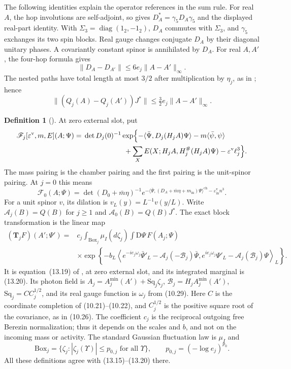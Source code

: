 \documentclass[11pt,letterpaper,reqno]{amsart}
\theoremstyle{definition}
\newtheorem{qcmdefinition}[qcmproposition]{Definition}
\newenvironment{definition}[1][]{\pushQED{\qed}\renewcommand{\qedsymbol}{$\blacksquare$}\begin{qcmdefinition}[#1]}{\popQED\end{qcmdefinition}}
\begin{document}
The following identities explain the operator references in the
sum rule. For real $A$, the hop involutions are self-adjoint,
so \cite[equations~(9.2)--(9.4)]{QEDConstruction} gives
$D_A^*=\gamma_5D_A\gamma_5$ and the displayed real-part identity.
With $\Sigma_3=\operatorname{diag}(1_2,-1_2)$, $D_A$ commutes
with $\Sigma_3$, and $\gamma_5$ exchanges its two spin blocks.
Real gauge changes conjugate $D_A$ by their diagonal unitary
phases. A covariantly constant spinor is annihilated by $D_A$.
For real $A,A'$, the four-hop formula gives
\[
 \|D_A-D_{A'}\|\le6e_j\|A-A'\|_\infty.
\]
The nested paths have total length at most $3/2$ after
multiplication by $\eta_j$, as in
\cite[Section~9.5]{QEDConstruction}; hence
\[
 \|(Q_j(A)-Q_j(A'))J^*\|
              \le\tfrac32e_j\|A-A'\|_\infty.
\]

\begin{definition}\label{qcm:rg-density}
At zero external slot, put
\begin{align*}
 \mathscr F_j[\varepsilon^{\mathrm v},m,E](A;\Psi)
 ={}&\det D_j(0)^{-1}\exp\Bigl\{
 -\langle\bar\Psi,D_j(H_jA)\Psi\rangle
 -m\langle\bar\psi,\psi\rangle\\
 &\hspace{20mm}+\sum_XE(X;H_jA,H_j^\#(H_jA)\Psi)
 -\varepsilon^{\mathrm v}\ell_j^3\Bigr\}.
\end{align*}
The mass pairing is the chamber pairing and the first pairing
is the unit-spinor pairing. At $j=0$ this means
\[
 \mathscr F_0(A;\Psi)=
 \det(D_0+\bar m\eta)^{-1}
 e^{-\langle\bar\Psi,(D_A+\bar m\eta+m_{\mathrm{in}})\Psi\rangle^{\mathrm{ch}}
        -\varepsilon_{\mathrm{in}}^{\mathrm v}n^3}.
\]
For a unit spinor $v$, its dilation is $v_L(y)=L^{-1}v(y/L)$.
Write $\mathcal A_j(B)=Q(B)$ for $j\ge1$ and
$\mathcal A_0(B)=Q(B)J^*$.
The exact block transformation is the linear map
\begin{align*}
 (\mathbf T_jF)(A';\Psi')
 ={}&c_j\int_{\mathrm{Box}_j}\mu_I(d\zeta_j)
       \int\mathrm D\Psi\,F(A_j;\Psi)\\
 &\times\exp\left\{-b_L\left\langle
 e^{-ie_j\omega_j}\bar\Psi'_L-\mathcal A_j(-\mathscr B_j)\bar\Psi,
 e^{ie_j\omega_j}\Psi'_L-\mathcal A_j(\mathscr B_j)\Psi
                         \right\rangle_L\right\}.
\end{align*}
It is equation~(13.19) of \cite{QEDConstruction}, at zero external
slot, and its integrated marginal is (13.20).
Its photon field is
$A_j=A_j^{\min}(A')+\mathrm{Sq}_j\zeta_j$,
$\mathscr B_j=H_jA_j^{\min}(A')$,
$\mathrm{Sq}_j=CC_j^{1/2}$, and its real gauge function is
$\omega_j$ from (10.29). Here $C$ is the coordinate completion
of (10.21)--(10.22), and $C_j^{1/2}$ is the positive square
root of the covariance, as in (10.26).
The coefficient $c_j$ is the reciprocal outgoing free Berezin
normalization; thus it depends on the scales and $b$, and not
on the incoming mass or activity. The standard Gaussian
fluctuation law is $\mu_I$ and
\[
 \mathrm{Box}_j=\{\zeta_j:|\zeta_j(\Upsilon)|\le p_{0,j}
                  \text{ for all }\Upsilon\},\qquad
 p_{0,j}=(-\log e_j)^{p_0}.
\]
All these definitions agree with (13.15)--(13.20) there.
\end{definition}
\end{document}

